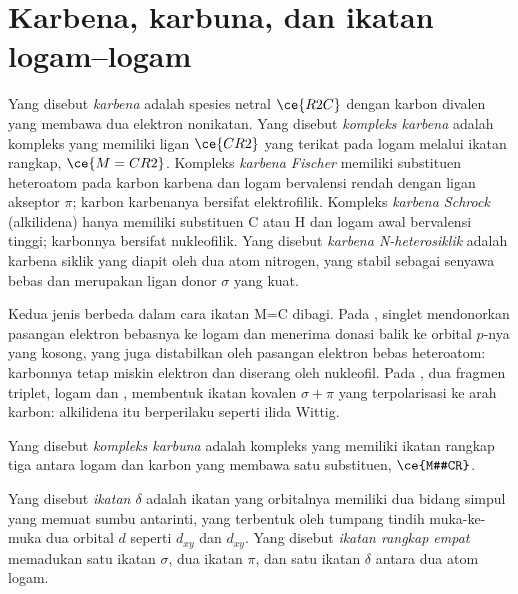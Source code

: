 \section{Karbena, karbuna, dan ikatan logam--logam}

\begin{definition}\label{def:b3:organometallic-bonding:carbene}
Yang disebut \emph{karbena} adalah spesies netral $\ce{R2C}$ dengan karbon divalen
yang membawa dua elektron nonikatan. Yang disebut \emph{kompleks karbena}
adalah kompleks yang memiliki ligan $\ce{CR2}$ yang terikat pada logam melalui ikatan rangkap, $\ce{M=CR2}$. Kompleks
\emph{karbena Fischer} memiliki substituen heteroatom
pada karbon karbena dan logam bervalensi rendah dengan ligan akseptor $\pi$; karbon karbenanya
bersifat elektrofilik. Kompleks \emph{karbena Schrock} (alkilidena)
hanya memiliki substituen C atau H dan logam awal bervalensi tinggi; karbonnya bersifat
nukleofilik. Yang disebut \emph{karbena N-heterosiklik} adalah
karbena siklik yang diapit oleh dua atom nitrogen, yang stabil sebagai senyawa bebas dan merupakan ligan
donor $\sigma$ yang kuat.
\end{definition}

Kedua jenis  berbeda dalam cara ikatan M=C dibagi.
Pada ,  singlet mendonorkan pasangan elektron bebasnya ke logam dan
menerima donasi balik ke orbital $p$-nya yang kosong, yang juga distabilkan oleh pasangan elektron bebas
heteroatom: karbonnya tetap miskin elektron dan diserang oleh nukleofil. Pada
, dua fragmen triplet, logam dan , membentuk ikatan kovalen $\sigma +
\pi$ yang terpolarisasi ke arah karbon: alkilidena itu berperilaku seperti ilida Wittig.

\begin{definition}\label{def:b3:organometallic-bonding:carbyne}
Yang disebut \emph{kompleks karbuna} adalah kompleks yang memiliki ikatan rangkap tiga antara logam
dan karbon yang membawa satu substituen, $\ce{M#CR}$.
\end{definition}

\begin{definition}\label{def:b3:organometallic-bonding:delta}
Yang disebut \emph{ikatan $\delta$} adalah ikatan yang orbitalnya memiliki dua bidang simpul
yang memuat sumbu antarinti, yang terbentuk oleh tumpang tindih muka-ke-muka dua orbital
$d$ seperti $d_{xy}$ dan $d_{xy}$. Yang disebut \emph{ikatan rangkap empat}
memadukan satu ikatan $\sigma$, dua ikatan $\pi$, dan satu ikatan $\delta$ antara dua atom logam.
\end{definition}

